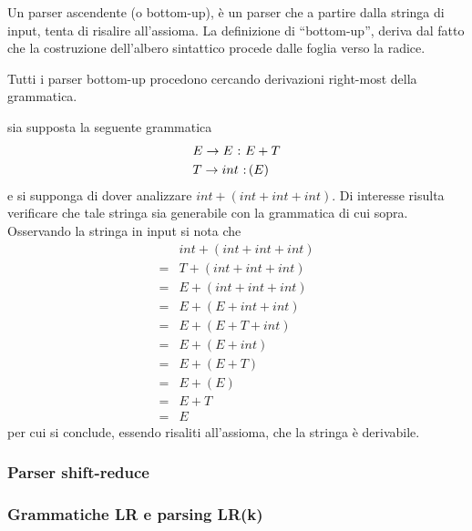 \documentclass{subfiles}
\begin{document}
Un parser ascendente (o bottom-up), è un parser che a partire dalla stringa di input, tenta di risalire all'assioma.
La definizione di ``bottom-up'', deriva dal fatto che la costruzione dell'albero sintattico procede dalle foglia verso la radice.

\begin{Note*}
    Tutti i parser bottom-up procedono cercando  derivazioni right-most della grammatica.

    \begin{Example*}
        sia supposta la seguente grammatica
        \[\begin{aligned}
                 & \Grammar{E}{E}[E + T] \\
                 & \Grammar{T}{int}[(E)]
            \end{aligned}\]
        e si supponga di dover analizzare \(int  + (int + int + int)\).
        Di interesse risulta verificare che tale stringa sia generabile con la grammatica di cui sopra.
        Osservando la stringa in input si nota che
        \[\begin{aligned}
                  & int + (int + int + int) \\
                = & T + (int + int + int)   \\
                = & E + (int + int + int)   \\
                = & E + (E + int + int)     \\
                = & E + (E + T + int)       \\
                = & E + (E + int)           \\
                = & E + (E + T)             \\
                = & E + (E)                 \\
                = & E + T                   \\
                = & E
            \end{aligned}\]
        per cui si conclude, essendo risaliti all'assioma, che la stringa è derivabile.
    \end{Example*}
\end{Note*}

\subsubsection{Parser shift-reduce}


\subsubsection{Grammatiche LR e parsing LR(k)}

\end{document}
